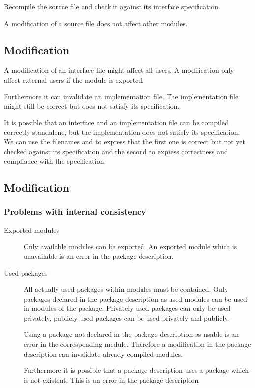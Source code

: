Recompile the source file and check it against its interface specification.

A modification of a source file does not affect other modules.


\subsection{ Modification}

A modification of an interface file might affect all users. A modification
only affect external users if the module is exported.

Furthermore it can invalidate an implementation file. The implementation file
might still be correct but does not satisfy its specification.

It is possible that an interface and an implementation file can be compiled
correctly standalone, but the implementation does not satisfy its
specification. We can use the filenames  and   to
express that the first one is correct but not yet checked against its
specification and the second to express correctness and compliance with the
specification.



\subsection{ Modification}


\subsubsection{Problems with internal consistency}

\begin{description}

\item[Exported modules] Only available modules can be exported. An exported
  module which is unavailable is an error in the package description.

\item[Used packages] All actually used packages within modules must be
  contained. Only packages declared in the package description as used modules
  can be used in modules of the package. Privately used packages can only be
  used privately, publicly used packages can be used privately and publicly.

  Using a package not declared in the package description as usable is an
  error in the corresponding module. Therefore a modification in the package
  description can invalidate already compiled modules.

  Furthermore it is possible that a package description uses a package which
  is not existent. This is an error in the package description.

\end{description}


